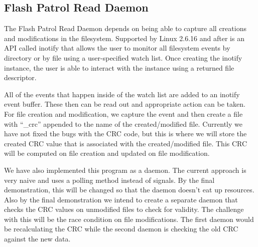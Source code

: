\subsection{Flash Patrol Read Daemon}
The Flash Patrol Read Daemon depends on being able to capture all creations 
and modifications in the filesystem. Supported by Linux 2.6.16 and after is an API
called inotify that allows the user to monitor all filesystem events by directory or by 
file using a user-specified watch list. Once creating the inotify instance, the user is able to 
interact with the instance using a returned file descriptor. 

All of the events that happen inside of the watch list are added to an inotify event buffer. 
These then can be read out and appropriate action can be taken. For file creation and 
modification, we capture the event and then create a file with ``\_crc'' appended to 
the name of the created/modified file. Currently we have not fixed the bugs with 
the CRC code, but this is where we will store the created CRC value that is 
associated with the created/modified file. This CRC will be computed on file creation
and updated on file modification.

We have also implemented this program as a daemon. The current approach is very
naive and uses a polling method instead of signals. By the final demonstration, this
will be changed so that the daemon doesn't eat up resources. Also by the final
demonstration we intend to create a separate daemon that checks the CRC 
values on unmodified files to check for validity. The challenge with this will be
the race condition on file modifications. The first daemon would be recalculating
the CRC while the second daemon is checking the old CRC against the new data.






